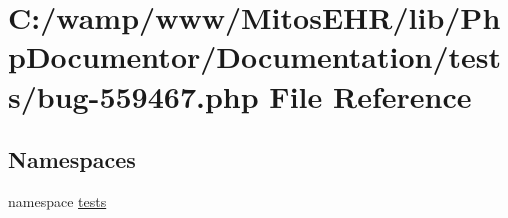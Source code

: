\hypertarget{bug-559467_8php}{\section{\-C\-:/wamp/www/\-Mitos\-E\-H\-R/lib/\-Php\-Documentor/\-Documentation/tests/bug-\/559467.php \-File \-Reference}
\label{bug-559467_8php}
}
\subsection*{\-Namespaces}
\begin{DoxyCompactItemize}
\item 
namespace \hyperlink{namespacetests}{tests}
\end{DoxyCompactItemize}
